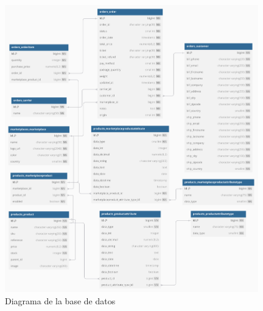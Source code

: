 \begin{figure} [H]
    \centering
    \includegraphics[width=0.98\textwidth]{figures/design_develop/database_diagram.pdf}
    \caption{Diagrama de la base de datos}
    \label{fig:diagrama_base_datos}
\end{figure}